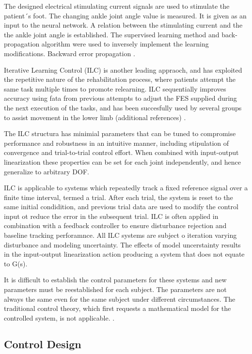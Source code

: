 The designed electrical stimulating current signals are used to stimulate the patient´s foot. The changing ankle joint angle value is measured. It is given as an input to the neural network. A relation between the stimulating current and the the ankle joint angle is established. The supervised learning method and back-propagation algorithm were used to inversely implement the learning modifications. Backward error propagation \cite{NNPID}.

Iterative Learning Control (ILC) is another leading appraoch, and has exploited the repetitive nature of the rehabilitation process, where patients attempt the same task multiple times to promote relearning. ILC sequentially improves accuracy using fata from previous attempts to adjust the FES supplied during the next execution of the tasks, and has been succesfully used by several groups to assist movement in the lower limb (additional references) \cite{IOL}.

The ILC structura has minimial parameters that can be tuned to compromise performance and robustness in an intuitive manner, including stipulation of convergence and trial-to-trial control effort. When combined with input-output linearization these properties can be set for each joint independently, and hence generalize to arbitrary DOF. \cite{IOL}

ILC is applicable to systems which repeatedly track a fixed reference signal over a finite time interval, termed a trial. 
After each trial, the system is reset to the same initial condidition, and previous trial data are used to modify the control input ot reduce the error in the subsequent trial. ILC is often applied in combination with a feedback controller to ensure disturbance rejection and baseline tracking perforamnce. All ILC systems are subject o iteration varying disturbance and modeling uncertainty. The effects of model uncerstainty results in the input-output linearization action producing a system that does not equate to G(s). 




It is difficult to establish the control parameters for these systems and new parameters must be reestablished for each subject. The parameters are not always the same even for the same subject under different circumstances. The traditional control theory, which first requests a mathematical model for the controlled system, is not applicable. \cite{NNPID}.

\subsection{Control Design}
